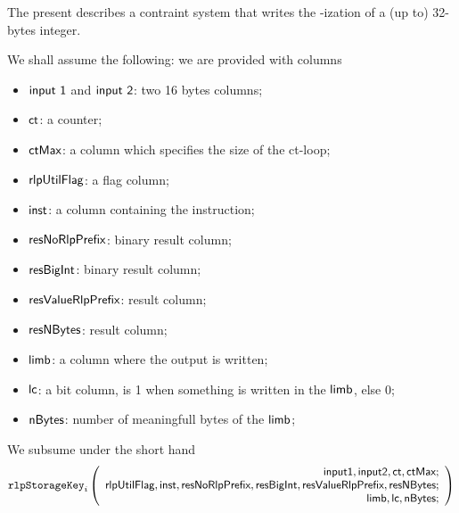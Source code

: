 The present describes a contraint system that writes the \rlp{}-ization of a (up to) 32-bytes integer.

We shall assume the following: we are provided with columns
\begin{itemize}
    \item $\textsf{input 1}$ and $\textsf{input 2}$: two 16 bytes columns;
    \item $\textsf{ct}$: a counter;
    \item $\textsf{ctMax}$: a column which specifies the size of the ct-loop;
    \item $\textsf{rlpUtilFlag}$: a flag column;
    \item $\textsf{inst}$: a column containing the instruction;
    \item $\textsf{resNoRlpPrefix}$: binary result column;
    \item $\textsf{resBigInt}$: binary result column;
    \item $\textsf{resValueRlpPrefix}$: result column;
    \item $\textsf{resNBytes}$: result column;
    \item $\textsf{limb}$: a column where the output is written;
    \item $\textsf{lc}$: a bit column, is 1 when something is written in the $\textsf{limb}$, else 0;
    \item $\textsf{nBytes}$: number of meaningfull bytes of the $\textsf{limb}$;
\end{itemize}

\noindent We subsume under the short hand
\[
    \texttt{rlpStorageKey}_{i}
    \left(
	\begin{array}{r}
    \textsf{input1},
    \textsf{input2},
    \textsf{ct},
    \textsf{ctMax}; \\
    \textsf{rlpUtilFlag},
    \textsf{inst},
    \textsf{resNoRlpPrefix},
    \textsf{resBigInt},
    \textsf{resValueRlpPrefix},
    \textsf{resNBytes}; \\
    \textsf{limb},
    \textsf{lc},
    \textsf{nBytes}; \\
    \end{array}
	\right)
\]

